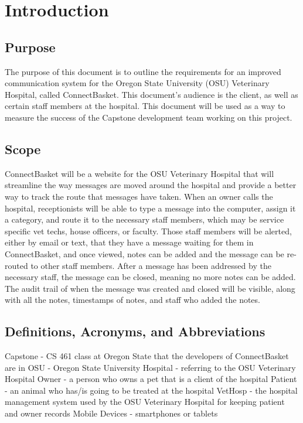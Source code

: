 \documentclass[onecolumn, draftclsnofoot,10pt, compsoc]{IEEEtran}
\begin{document}
\section{Introduction}

\subsection{Purpose}
The purpose of this document is to outline the requirements for an improved communication system for the Oregon State University (OSU) Veterinary Hospital, called ConnectBasket. 
This document's audience is the client, as well as certain staff members at the hospital. This document will be used as a way to measure the success of the Capstone development team working on this project. 


\subsection{Scope}
ConnectBasket will be a website for the OSU Veterinary Hospital that will streamline the way messages are moved around the hospital and provide a better way to track the route that messages have taken. When an owner calls the hospital, receptionists will be able to type a message into the computer, assign it a category, and route it to the necessary staff members, which may be service specific vet techs, house officers, or faculty. Those staff members will be alerted, either by email or text, that they have a message waiting for them in ConnectBasket, and once viewed, notes can be added and the message can be re-routed to other staff members. After a message has been addressed by the necessary staff, the message can be closed, meaning no more notes can be added. The audit trail of when the message was created and closed will be visible, along with all the notes, timestamps of notes, and staff who added the notes.


\subsection{Definitions, Acronyms, and Abbreviations}
Capstone - CS 461 class at Oregon State that the developers of ConnectBasket are in 
OSU - Oregon State University
Hospital - referring to the OSU Veterinary Hospital
Owner - a person who owns a pet that is a client of the hospital
Patient - an animal who has/is going to be treated at the hospital 
VetHosp - the hospital management system used by the OSU Veterinary Hospital for keeping patient and owner records
Mobile Devices - smartphones or tablets
\end{document}
